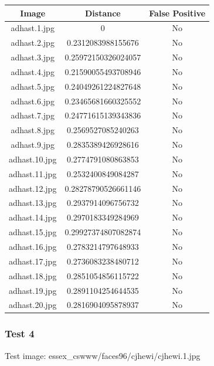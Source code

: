 \documentclass[12pt]{article}
\begin{document}
\begin{center}
\begin{tabular}{ccc}
Image & Distance & False Positive \\
\hline
adhast.1.jpg & 0 & No \\
adhast.2.jpg & 0.2312083988155676 & No \\
adhast.3.jpg & 0.25972150326024057 & No \\
adhast.4.jpg & 0.21590055493708946 & No \\
adhast.5.jpg & 0.24049261224827648 & No \\
adhast.6.jpg & 0.23465681660325552 & No \\
adhast.7.jpg & 0.24771615139343836 & No \\
adhast.8.jpg & 0.2569527085240263 & No \\
adhast.9.jpg & 0.2835389426928616 & No \\
adhast.10.jpg & 0.2774791080863853 & No \\
adhast.11.jpg & 0.2532400849084287 & No \\
adhast.12.jpg & 0.28278790526661146 & No \\
adhast.13.jpg & 0.2937914096756732 & No \\
adhast.14.jpg & 0.2970183349284969 & No \\
adhast.15.jpg & 0.29927374807082874 & No \\
adhast.16.jpg & 0.2783214797648933 & No \\
adhast.17.jpg & 0.2736083238480712 & No \\
adhast.18.jpg & 0.2851054856115722 & No \\
adhast.19.jpg & 0.2891104254644535 & No \\
adhast.20.jpg & 0.2816904095878937 & No \\
\end{tabular}
\end{center}

\newpage
\subsubsection{Test 4}
Test image: essex\_cswww/faces96/cjhewi/cjhewi.1.jpg
\end{document}
